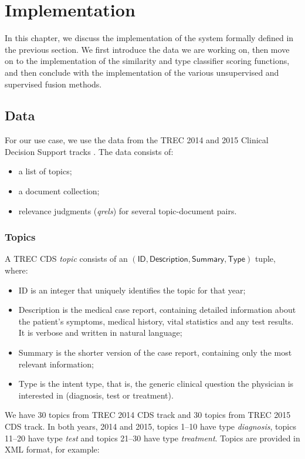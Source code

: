 \chapter{Implementation}\label{impl}

In this chapter, we discuss the implementation of the system formally defined in the previous section. We first
introduce the data we are working on, then move on to the implementation of the similarity and type classifier scoring functions,
and then conclude with the implementation of the various unsupervised and supervised fusion methods.

\section{Data}
For our use case, we use the data from the TREC 2014 and 2015 Clinical Decision Support tracks \cite{trec}. The data consists of:
\begin{itemize}
 \item a list of topics;
 \item a document collection;
 \item relevance judgments (\emph{qrels}) for several topic-document pairs.
\end{itemize}

\subsection{Topics}
A TREC CDS \emph{topic} consists of an $(\textsf{ID}, \textsf{Description}, \textsf{Summary}, \textsf{Type})$ tuple, where:
\begin{itemize}
 \item \textsf{ID} is an integer that uniquely identifies the topic for that year;
 \item \textsf{Description} is the medical case report, containing detailed information about
 the patient's symptoms, medical history, vital statistics and any test results. It is verbose and written in natural language;
 \item \textsf{Summary} is the shorter version of the case report, containing only the most relevant information;
 \item \textsf{Type} is the intent type, that is, the generic clinical question the physician is interested in
  (diagnosis, test or treatment).
\end{itemize}

We have 30 topics from TREC 2014 CDS track and 30 topics from TREC 2015 CDS track.
In both years, 2014 and 2015, topics 1--10 have type \emph{diagnosis}, topics 11--20 have type \emph{test}
and topics 21--30 have type \emph{treatment}.
Topics are provided in XML format, for example:

